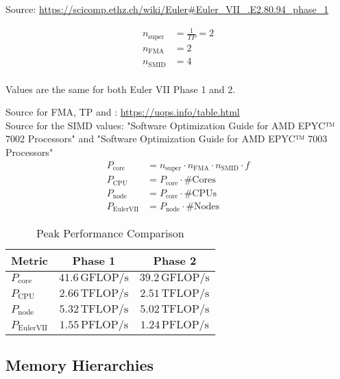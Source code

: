 \documentclass[unicode,11pt,a4paper,oneside,numbers=endperiod,openany]{scrartcl}
\begin{document}
Source: \url{https://scicomp.ethz.ch/wiki/Euler#Euler_VII_.E2.80.94_phase_1}

\begin{align*}
n_{\mathrm{super}} &= \frac{1}{TP} = 2 \\
n_{\mathrm{FMA}} &= 2 \\
n_{\mathrm{SMID}} &= 4 \\
\end{align*}

Values are the same for both Euler VII Phase 1 and 2.

Source for FMA, TP and : \url{https://uops.info/table.html} \\
Source for the SIMD values: "Software Optimization Guide for AMD EPYC™ 7002 Processors" and "Software Optimization Guide for AMD EPYC™ 7003 Processors"\\

\begin{align*}
P_{\mathrm{core}} &= n_{\mathrm{super}} \cdot n_{\mathrm{FMA}} \cdot n_{\mathrm{SMID}} \cdot f \\
P_{\mathrm{CPU}} &= P_{\mathrm{core}} \cdot \text{{\#Cores}} \\
P_{\mathrm{node}} &= P_{\mathrm{core}} \cdot \text{{\#CPUs}} \\
P_{\mathrm{Euler VII}} &= P_{\mathrm{node}} \cdot \text{{\#Nodes}}
\end{align*}

\begin{table}[ht]
\centering
\caption{Peak Performance Comparison}
\begin{tabular}{|l|c|c|}
\hline
\textbf{Metric} & \textbf{Phase 1} & \textbf{Phase 2} \\ \hline
$P_{\mathrm{core}}$ & $41.6 \, \mathrm{GFLOP/s}$ & $39.2 \, \mathrm{GFLOP/s}$ \\ \hline
$P_{\mathrm{CPU}}$ & $2.66 \, \mathrm{TFLOP/s}$ & $2.51 \, \mathrm{TFLOP/s}$ \\ \hline
$P_{\mathrm{node}}$ & $5.32 \, \mathrm{TFLOP/s}$ & $5.02 \, \mathrm{TFLOP/s}$ \\ \hline
$P_{\mathrm{Euler VII}}$ & $1.55 \, \mathrm{PFLOP/s}$ & $1.24 \, \mathrm{PFLOP/s}$ \\ \hline

\end{tabular}
\end{table}

\subsection{Memory Hierarchies}
\end{document}
